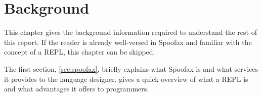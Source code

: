 \chapter{Background}
\label{cha:background}

This chapter gives the background information required to understand the rest of
this report. If the reader is already well-versed in Spoofax and familiar with
the concept of a REPL, this chapter can be skipped.

The first section, \cref{sec:spoofax}, briefly explains what Spoofax is and what
services it provides to the language designer.  gives a quick
overview of what a REPL is and what advantages it offers to programmers.





